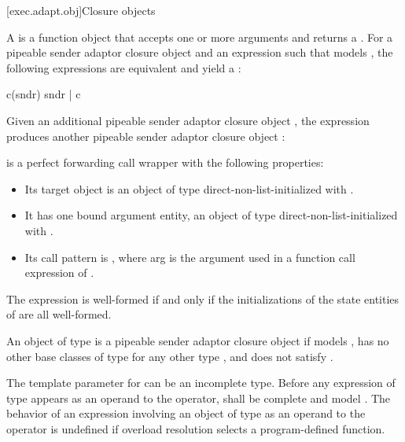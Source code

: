 [exec.adapt.obj]{Closure objects}

\pnum
A  is a function object
that accepts one or more  arguments and returns a .
For a pipeable sender adaptor closure object  and
an expression 
such that  models ,
the following expressions are equivalent and yield a :
\begin{codeblock}
c(sndr)
sndr | c
\end{codeblock}
Given an additional pipeable sender adaptor closure object ,
the expression  produces
another pipeable sender adaptor closure object :

 is a perfect forwarding call wrapper
with the following properties:
\begin{itemize}
\item
Its target object is an object  of type 
direct-non-list-initialized with .
\item
It has one bound argument entity,
an object  of type 
direct-non-list-initialized with .
\item
Its call pattern is ,
where arg is the argument used in a function call expression of .
\end{itemize}
The expression  is well-formed if and only if
the initializations of the state entities of 
are all well-formed.

\pnum
An object  of type  is
a pipeable sender adaptor closure object
if  models ,
 has no other base classes
of type  for any other type , and
 does not satisfy .

\pnum
The template parameter  for  can be
an incomplete type.
Before any expression of type \cv{}  appears as
an operand to the \tcode{|} operator,
 shall be complete and
model .
The behavior of an expression involving an object of type \cv{} 
as an operand to the \tcode{|} operator is undefined
if overload resolution selects a program-defined  function.

